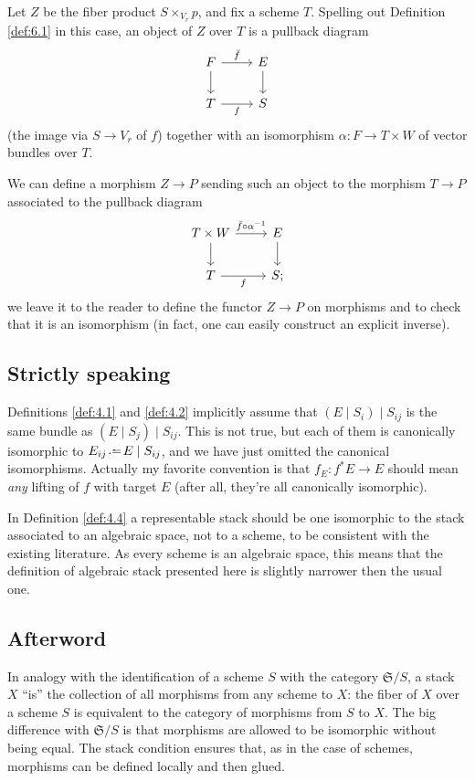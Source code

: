 \documentclass[12pt]{memoir}
\begin{document}
Let $Z$ be the fiber product $S \times_{V_r} p$, and fix a scheme $T$. Spelling out Definition \ref{def:6.1} in this case, an object of $Z$ over $T$ is a pullback diagram
$$
\begin{tikzcd}
F \arrow[r, "\bar{f}"] \arrow[d] & E \arrow[d] \\
T \arrow[r, "f"'] & S
\end{tikzcd}
$$
(the image via $S \to V_r$ of $f$) together with an isomorphism $\alpha\colon F \to T \times W$ of vector bundles over $T$.

We can define a morphism $Z \to P$ sending such an object to the morphism $T \to P$ associated to the pullback diagram
$$
\begin{tikzcd}
T \times W \arrow[r, "\bar{f} \circ \alpha^{-1}"] \arrow[d] & E \arrow[d] \\
T \arrow[r, "f"'] & S;
\end{tikzcd}
$$
we leave it to the reader to define the functor $Z \to P$ on morphisms and to check that it is an isomorphism (in fact, one can easily construct an explicit inverse).


\subsection{Strictly speaking}
\label{sec:strictly-speaking}

Definitions \ref{def:4.1} and \ref{def:4.2} implicitly assume that $(E \mid S_i) \mid S_{ij}$ is the same bundle as $(E \mid S_j) \mid S_{ij}$. This is not true, but each of them is canonically isomorphic to $E_{ij} \defeq E \mid S_{ij}$, and we have just omitted the canonical isomorphisms. Actually my favorite convention is that $f_E\colon f^* E \to E$ should mean \emph{any} lifting of $f$ with target $E$ (after all, they're all canonically isomorphic).

In Definition \ref{def:4.4} a representable stack should be one isomorphic to the stack associated to an algebraic space, not to a scheme, to be consistent with the existing literature. As every scheme is an algebraic space, this means that the definition of algebraic stack presented here is slightly narrower then the usual one.

\subsection{Afterword}

In analogy with the identification of a scheme $S$ with the category $\mathfrak{S}/S$, a stack $X$ ``is'' the collection of all morphisms from any scheme to $X$: the fiber of $X$ over a scheme $S$ is equivalent to the category of morphisms from $S$ to $X$. The big difference with $\mathfrak{S}/S$ is that morphisms are allowed to be isomorphic without being equal. The stack condition ensures that, as in the case of schemes, morphisms can be defined locally and then glued.
\end{document}
